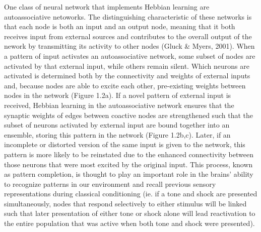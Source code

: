 \documentclass[12pt,a4paperpaper,]{report}
\begin{document}
One class of neural network that implements Hebbian learning are
autoassociative netoworks. The distinguishing characteristic of these
networks is that each node is both an input and an output node, meaning
that it both receives input from external sources and contributes to the
overall output of the nework by transmitting its activity to other nodes
(Gluck \& Myers, 2001). When a pattern of input activates an
autoassociative network, some subset of nodes are activated by that
external input, while others remain silent. Which neurons are activated
is determined both by the connectivity and weights of external inputs
and, because nodes are able to excite each other, pre-existing weights
between nodes in the network (Figure 1.2a). If a novel pattern of
external input is received, Hebbian learning in the autoassociative
network ensures that the synaptic weights of edges between coactive
nodes are strengthened such that the subset of neurons activated by
external input are bound together into an ensemble, storing this pattern
in the network (Figure 1.2b,c). Later, if an incomplete or distorted
version of the same input is given to the network, this pattern is more
likely to be reinstated due to the enhanced connectivity between those
neurons that were most excited by the original input. This process,
known as pattern completion, is thought to play an important role in the
brains' ability to recognize patterns in our environment and recall
previous sensory representations during classical conditioning (ie. if a
tone and shock are presented simultaneously, nodes that respond
selectively to either stimulus will be linked such that later
presentation of either tone or shock alone will lead reactivation to the
entire population that was active when both tone and shock were
presented).
\end{document}

